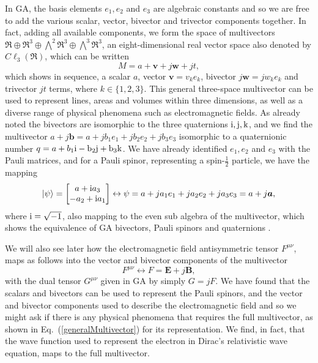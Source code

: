 \documentclass[prb,preprint]{revtex4}
\newcommand{\be}{\begin{equation}}
\newcommand{\ee}{\end{equation}}
\newcommand{\iGA}{{j}}
\begin{document}
In GA, the basis elements $ e_1, e_2 $ and $ e_3 $ are algebraic constants and so we are free to add the various scalar, vector, bivector and trivector components together.
In fact, adding all available components, we form the space of multivectors $ \Re \oplus \Re^3 \oplus \bigwedge^2 \Re^3 \oplus \bigwedge^3 \Re^3 $, an eight-dimensional real vector space also denoted by $ C\ell_{3}(\Re) $, which can be written
\be \label{generalMultivector}
M = a + \boldsymbol{v} + \iGA \boldsymbol{w} + \iGA t ,
\ee
which shows in sequence, a scalar $ a $, vector $ \boldsymbol{v} = v_k e_k $, bivector $ \iGA \boldsymbol{w} = \iGA w_k e_k $ and trivector $ \iGA t $ terms, where $ k \in \{1,2,3\} $.
This general three-space multivector can be used to represent lines, areas and volumes within three dimensions, as well as a diverse range of physical phenomena such as electromagnetic fields.
As already noted the bivectors are isomorphic to the three quaternions $ \rm{i},\rm{j},\rm{k} $, and we find the multivector $ a + \iGA \boldsymbol{b} = a + \iGA b_1 e_1 + \iGA b_2 e_2 + \iGA b_3 e_3 $ isomorphic to a quaternionic number $ q = a + b_1 \rm{i} - b_2 \rm{j} + b_3 \rm{k} $. 
We have already identified $ e_1, e_2 $ and $ e_3 $ with the Pauli matrices, and for a Pauli spinor, representing a spin-$\frac{1}{2} $ particle, we have the mapping 
\be \label{SpinorMapping}
| \psi \rangle = \begin{bmatrix} a + {\rm{i}} a_3  \\ -a_2 + {\rm{i}} a_1  \end{bmatrix} \leftrightarrow \psi = a + \iGA a_1 e_1 + \iGA a_2 e_2 + \iGA a_3 e_3 = a + \iGA \boldsymbol{a},
\ee
where $ {\rm{i}} = \sqrt{-1} $, also mapping to the even sub algebra of the multivector, which shows the equivalence of GA bivectors, Pauli spinors and quaternions \cite{CIL}.

We will also see later how the electromagnetic field antisymmetric tensor $ F^{\mu \nu} $, maps as follows into the vector and bivector components of the multivector \cite{Griffiths:1999}
\be \label{FieldTensorMapping}
F^{\mu \nu} \leftrightarrow F = \boldsymbol{E}+\iGA \boldsymbol{B} ,
\ee
with the dual tensor $ G^{\mu \nu} $ given in GA by simply $ G = \iGA F $. We have found that the scalars and bivectors can be used to represent the Pauli spinors, and the vector and bivector components used to describe the electromagnetic field and so we might ask if there is any physical phenomena that requires the full multivector, as shown in Eq.~(\ref{generalMultivector}) for its representation.  We find, in fact, that the wave function used to represent the electron in Dirac's relativistic wave equation, maps to the full multivector.
\end{document}
